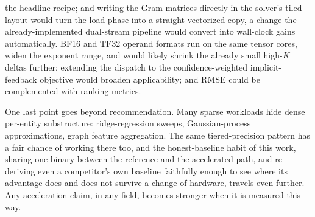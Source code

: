 the headline recipe; and writing the Gram matrices directly in the solver's tiled layout would turn the load phase into a straight vectorized copy, a change the already-implemented dual-stream pipeline would convert into wall-clock gains automatically. BF16 and TF32 operand formats run on the same tensor cores, widen the exponent range, and would likely shrink the already small high-$K$ deltas further; extending the dispatch to the confidence-weighted implicit-feedback objective \cite{hu2008collaborative} would broaden applicability; and RMSE could be complemented with ranking metrics.

One last point goes beyond recommendation. Many sparse workloads hide dense per-entity substructure: ridge-regression sweeps, Gaussian-process approximations, graph feature aggregation. The same tiered-precision pattern has a fair chance of working there too, and the honest-baseline habit of this work, sharing one binary between the reference and the accelerated path, and re-deriving even a competitor's own baseline faithfully enough to see where its advantage does and does not survive a change of hardware, travels even further. Any acceleration claim, in any field, becomes stronger when it is measured this way.
